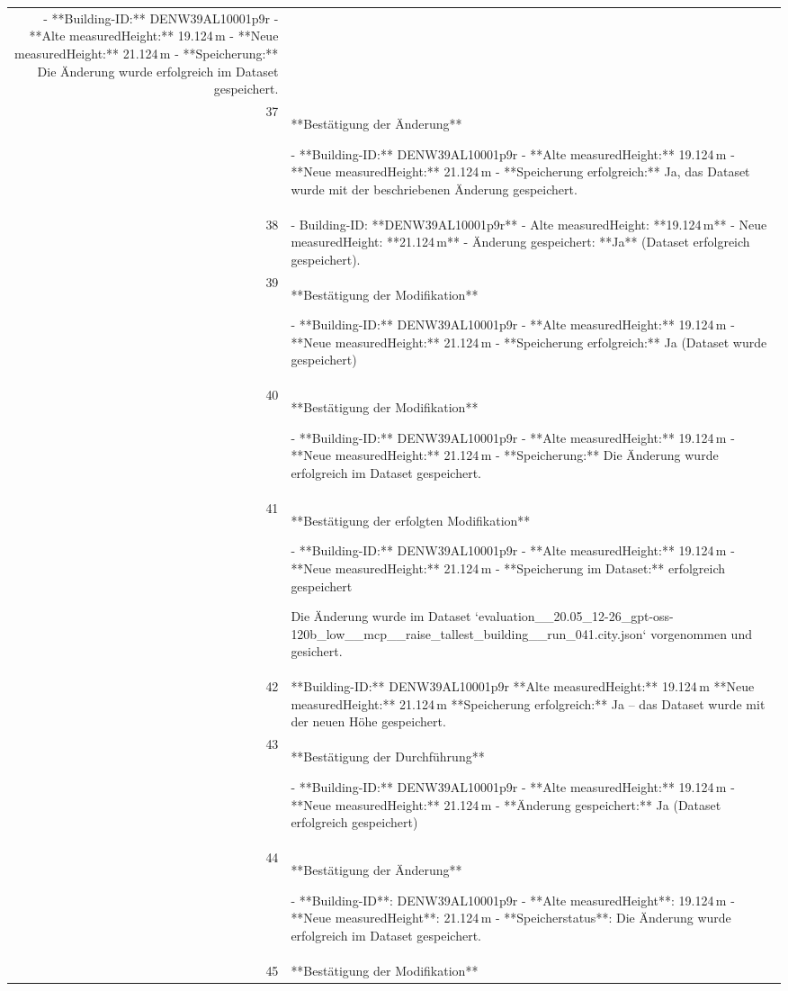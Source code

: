 \documentclass[a4paper,11pt]{article}
\begin{document}
\begin{table}[ht]
\begin{tabular}{r p{12cm}}
- **Building-ID:** DENW39AL10001p9r  
- **Alte measuredHeight:** 19.124 m  
- **Neue measuredHeight:** 21.124 m  
- **Speicherung:** Die Änderung wurde erfolgreich im Dataset gespeichert. \\
37 & **Bestätigung der Änderung**

- **Building-ID:** DENW39AL10001p9r  
- **Alte measuredHeight:** 19.124 m  
- **Neue measuredHeight:** 21.124 m  
- **Speicherung erfolgreich:** Ja, das Dataset wurde mit der beschriebenen Änderung gespeichert. \\
38 & - Building-ID: **DENW39AL10001p9r**  
- Alte measuredHeight: **19.124 m**  
- Neue measuredHeight: **21.124 m**  
- Änderung gespeichert: **Ja** (Dataset erfolgreich gespeichert). \\
39 & **Bestätigung der Modifikation**

- **Building-ID:** DENW39AL10001p9r  
- **Alte measuredHeight:** 19.124 m  
- **Neue measuredHeight:** 21.124 m  
- **Speicherung erfolgreich:** Ja (Dataset wurde gespeichert) \\
40 & **Bestätigung der Modifikation**

- **Building-ID:** DENW39AL10001p9r  
- **Alte measuredHeight:** 19.124 m  
- **Neue measuredHeight:** 21.124 m  
- **Speicherung:** Die Änderung wurde erfolgreich im Dataset gespeichert. \\
41 & **Bestätigung der erfolgten Modifikation**

- **Building-ID:** DENW39AL10001p9r  
- **Alte measuredHeight:** 19.124 m  
- **Neue measuredHeight:** 21.124 m  
- **Speicherung im Dataset:** erfolgreich gespeichert  

Die Änderung wurde im Dataset `evaluation\_\_20.05\_12-26\_gpt-oss-120b\_low\_\_mcp\_\_raise\_tallest\_building\_\_run\_041.city.json` vorgenommen und gesichert. \\
42 & **Building-ID:** DENW39AL10001p9r  
**Alte measuredHeight:** 19.124 m  
**Neue measuredHeight:** 21.124 m  
**Speicherung erfolgreich:** Ja – das Dataset wurde mit der neuen Höhe gespeichert. \\
43 & **Bestätigung der Durchführung**

- **Building-ID:** DENW39AL10001p9r  
- **Alte measuredHeight:** 19.124 m  
- **Neue measuredHeight:** 21.124 m  
- **Änderung gespeichert:** Ja (Dataset erfolgreich gespeichert) \\
44 & **Bestätigung der Änderung**

- **Building-ID**: DENW39AL10001p9r  
- **Alte measuredHeight**: 19.124 m  
- **Neue measuredHeight**: 21.124 m  
- **Speicherstatus**: Die Änderung wurde erfolgreich im Dataset gespeichert. \\
45 & **Bestätigung der Modifikation**


\end{tabular}
\end{table}
\end{document}
